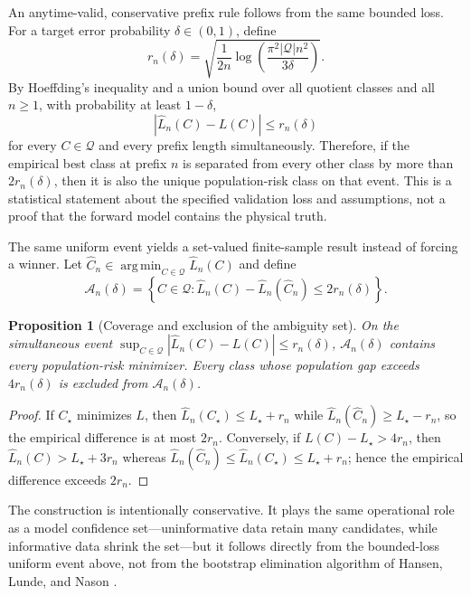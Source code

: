 \documentclass[11pt]{article}
\newtheorem{proposition}[theorem]{Proposition}
\newcommand{\argmin}{\operatorname*{arg\,min}}
\newcommand{\abs}[1]{\left\lvert #1 \right\rvert}
\newcommand{\set}[1]{\left\{ #1 \right\}}
\begin{document}
    An anytime-valid, conservative prefix rule follows from the same bounded loss. For a
    target error probability $\delta\in(0,1)$, define
    \begin{equation}
        r_n(\delta)
        =\sqrt{\frac{1}{2n}
        \log\!\left(\frac{\pi^2\abs{\mathcal Q}n^2}{3\delta}\right)}.
    \end{equation}
    By Hoeffding's inequality \cite{hoeffding1963} and a union bound over all quotient classes and all
    $n\ge1$, with probability at least $1-\delta$,
    \begin{equation}
        \abs{\widehat L_n(C)-L(C)}\le r_n(\delta)
    \end{equation}
    for every $C\in\mathcal Q$ and every prefix length simultaneously. Therefore, if the empirical best
    class at prefix $n$ is separated from every other class by more than $2r_n(\delta)$,
    then it is also the unique population-risk class on that event. This is a statistical
    statement about the specified validation loss and assumptions, not a proof that the
    forward model contains the physical truth.

    The same uniform event yields a set-valued finite-sample result instead of forcing a
    winner. Let $\widehat C_n\in\argmin_{C\in\mathcal Q}\widehat L_n(C)$ and define
    \begin{equation}
        \mathcal A_n(\delta)
        =\set{C\in\mathcal Q:
        \widehat L_n(C)-\widehat L_n(\widehat C_n)
            \le 2r_n(\delta)}.
        \label{eq:ambiguity-set}
    \end{equation}
    \begin{proposition}[Coverage and exclusion of the ambiguity set]
On the simultaneous event
$\sup_{C\in\mathcal Q}\abs{\widehat L_n(C)-L(C)}\le r_n(\delta)$,
$\mathcal A_n(\delta)$ contains every population-risk minimizer. Every class whose
population gap exceeds $4r_n(\delta)$ is excluded from $\mathcal A_n(\delta)$.
    \end{proposition}
    \begin{proof}
        If $C_\star$ minimizes $L$, then
        $\widehat L_n(C_\star)\le L_\star+r_n$ while
        $\widehat L_n(\widehat C_n)\ge L_\star-r_n$, so the empirical difference is at most
        $2r_n$. Conversely, if $L(C)-L_\star>4r_n$, then
        $\widehat L_n(C)>L_\star+3r_n$ whereas
        $\widehat L_n(\widehat C_n)\le\widehat L_n(C_\star)\le L_\star+r_n$; hence the
        empirical difference exceeds $2r_n$.
    \end{proof}
    The construction is intentionally conservative. It plays the same operational role as
    a model confidence set---uninformative data retain many candidates, while informative
    data shrink the set---but it follows directly from the bounded-loss uniform event above,
    not from the bootstrap elimination algorithm of Hansen, Lunde, and Nason
    \cite{hansen2011}.
\end{document}
